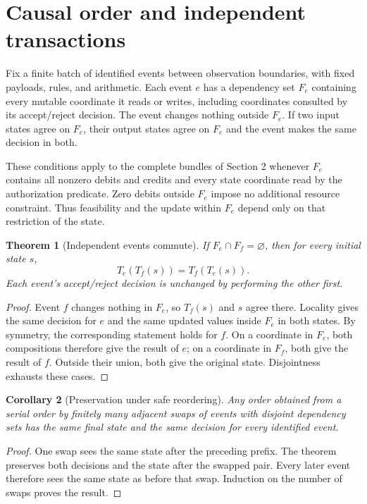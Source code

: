 \documentclass[11pt,a4paper]{article}
\newtheorem{theorem}{Theorem}[section]
\newtheorem{corollary}[theorem]{Corollary}
\begin{document}
\section{Causal order and independent transactions}
Fix a finite batch of identified events between observation boundaries, with fixed payloads, rules, and arithmetic. Each event $e$ has a dependency set $F_e$ containing every mutable coordinate it reads or writes, including coordinates consulted by its accept/reject decision. The event changes nothing outside $F_e$. If two input states agree on $F_e$, their output states agree on $F_e$ and the event makes the same decision in both.

These conditions apply to the complete bundles of Section 2 whenever $F_e$ contains all nonzero debits and credits and every state coordinate read by the authorization predicate. Zero debits outside $F_e$ impose no additional resource constraint. Thus feasibility and the update within $F_e$ depend only on that restriction of the state.

\begin{theorem}[Independent events commute]
If $F_e\cap F_f=\varnothing$, then for every initial state $s$,
\begin{equation}
T_e(T_f(s))=T_f(T_e(s)).
\end{equation}
Each event's accept/reject decision is unchanged by performing the other first.
\end{theorem}
\begin{proof}
Event $f$ changes nothing in $F_e$, so $T_f(s)$ and $s$ agree there. Locality gives the same decision for $e$ and the same updated values inside $F_e$ in both states. By symmetry, the corresponding statement holds for $f$. On a coordinate in $F_e$, both compositions therefore give the result of $e$; on a coordinate in $F_f$, both give the result of $f$. Outside their union, both give the original state. Disjointness exhausts these cases.
\end{proof}

\begin{corollary}[Preservation under safe reordering]
Any order obtained from a serial order by finitely many adjacent swaps of events with disjoint dependency sets has the same final state and the same decision for every identified event.
\end{corollary}
\begin{proof}
One swap sees the same state after the preceding prefix. The theorem preserves both decisions and the state after the swapped pair. Every later event therefore sees the same state as before that swap. Induction on the number of swaps proves the result.
\end{proof}
\end{document}
